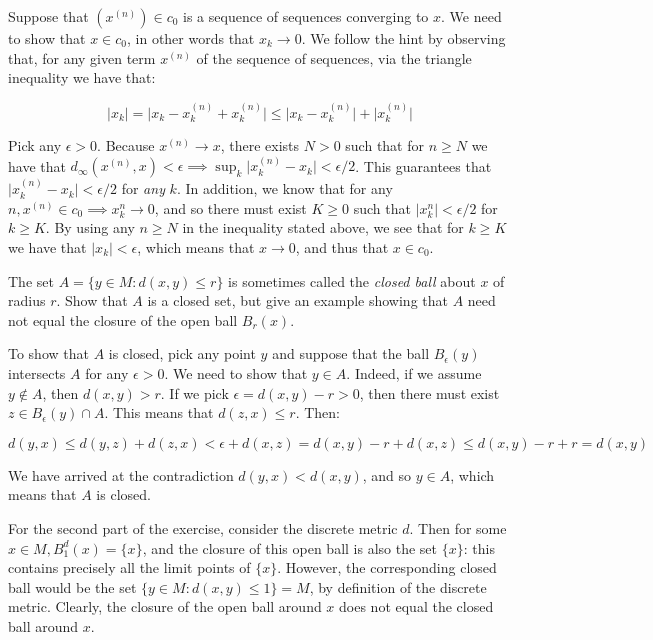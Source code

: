 \begin{solution}
    
    Suppose that $(x^{(n)}) \in c_0$ is a sequence of sequences converging to $x$.
    We need to show that $x \in c_0$, in other words that $x_k \rightarrow 0$.
    We follow the hint by observing that, for any given term $x^{(n)}$ of the sequence of sequences, via the triangle inequality we have that:

    $$\lvert x_k \rvert = \lvert x_k - x_{k}^{(n)} + x_{k}^{(n)} \rvert \leq \lvert x_k - x_k^{(n)} \rvert + \lvert x_k^{(n)} \rvert$$

    Pick any $\epsilon > 0$.
    Because $x^{(n)} \rightarrow x$, there exists $N > 0$ such that for $n \geq N$ we have that $d_{\infty}(x^{(n)}, x) < \epsilon \implies \sup_{k} \lvert x_k^{(n)} - x_k \rvert < \epsilon/2$.
    This guarantees that $\lvert x_k^{(n)} - x_k \rvert < \epsilon/2$ for \textit{any} $k$.
    In addition, we know that for any $n, x^{(n)} \in c_0 \implies x_k^{n} \rightarrow 0$, and so there must exist $K \geq 0$ such that $\lvert x_k^{n} \rvert < \epsilon/2$ for $k \geq K$.
    By using any $n \geq N$ in the inequality stated above, we see that for $k \geq K$ we have that $\lvert x_k \rvert < \epsilon$, which means that $x \rightarrow 0$, and thus that $x \in c_0$.
\end{solution}

\begin{exercise}{15}
    The set $A = \{y \in M : d(x, y) \leq r \}$ is sometimes called the \textit{closed ball} about $x$ of radius $r$.
    Show that $A$ is a closed set, but give an example showing that $A$ need not equal the closure of the open ball $B_r(x)$.
\end{exercise}

\begin{solution}
    
    To show that $A$ is closed, pick any point $y$ and suppose that the ball $B_{\epsilon}(y)$ intersects $A$ for any $\epsilon > 0$.
    We need to show that $y \in A$.
    Indeed, if we assume $y \notin A$, then $d(x, y) > r$.
    If we pick $\epsilon = d(x, y) - r > 0$, then there must exist $z \in B_{\epsilon}(y) \cap A$.
    This means that $d(z, x) \leq r$.
    Then:
    
    $$d(y, x) \leq d(y, z) + d(z, x) < \epsilon + d(x, z) = d(x, y) - r + d(x, z) \leq d(x, y) - r + r = d(x, y)$$

    We have arrived at the contradiction $d(y, x) < d(x, y)$, and so $y \in A$, which means that $A$ is closed.

    For the second part of the exercise, consider the discrete metric $d$.
    Then for some $x \in M, B_1^d(x) = \{x\}$, and the closure of this open ball is also the set $\{x\}$: this contains precisely all the limit points of $\{x\}$.
    However, the corresponding closed ball would be the set $\{y \in M : d(x, y) \leq 1 \} = M$, by definition of the discrete metric.
    Clearly, the closure of the open ball around $x$ does not equal the closed ball around $x$.
\end{solution}

